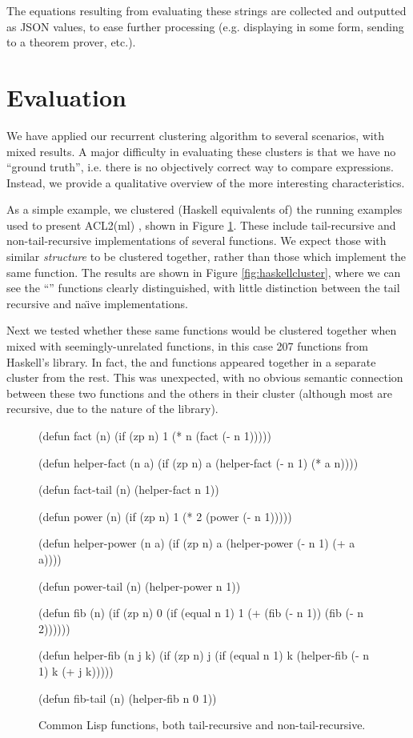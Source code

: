 The equations resulting from evaluating these strings are collected and
outputted as JSON values, to ease further processing (e.g. displaying in some
form, sending to a theorem prover, etc.).

\section{Evaluation}
\label{sec:evaluation}

We have applied our recurrent clustering algorithm to several scenarios, with
mixed results. A major difficulty in evaluating these clusters is that we have
no ``ground truth'', i.e. there is no objectively correct way to compare
expressions. Instead, we provide a qualitative overview of the more interesting
characteristics.

As a simple example, we clustered (Haskell equivalents of) the running examples
used to present ACL2(ml) \cite{heras2013proof}, shown in Figure
\ref{fig:lisp}. These include tail-recursive and non-tail-recursive
implementations of several functions. We expect those with similar
\emph{structure} to be clustered together, rather than those which implement the
same function. The results are shown in Figure \ref{fig:haskellcluster}, where
we can see the ``'' functions clearly distinguished, with little
distinction between the tail recursive and na\"{\i}ve implementations.

Next we tested whether these same functions would be clustered together when
mixed with seemingly-unrelated functions, in this case 207 functions from
Haskell's  library. In fact, the  and 
functions appeared together in a separate cluster from the rest. This was
unexpected, with no obvious semantic connection between these two functions and
the others in their cluster (although most are recursive, due to the nature of
the  library).

\begin{figure}
  \begin{common-lisp}
(defun fact (n)
  (if (zp n) 1 (* n (fact (- n 1)))))

(defun helper-fact (n a)
  (if (zp n) a (helper-fact (- n 1) (* a n))))

(defun fact-tail (n)
  (helper-fact n 1))

(defun power (n)
  (if (zp n) 1 (* 2 (power (- n 1)))))

(defun helper-power (n a)
  (if (zp n) a (helper-power (- n 1) (+ a a))))

(defun power-tail (n)
  (helper-power n 1))

(defun fib (n)
  (if (zp n)
      0
      (if (equal n 1)
          1
          (+ (fib (- n 1)) (fib (- n 2))))))

(defun helper-fib (n j k)
  (if (zp n)
      j
      (if (equal n 1)
          k
          (helper-fib (- n 1) k (+ j k)))))

(defun fib-tail (n)
  (helper-fib n 0 1))
  \end{common-lisp}
  \caption{Common Lisp functions, both tail-recursive and non-tail-recursive.}
  \label{fig:lisp}
\end{figure}

